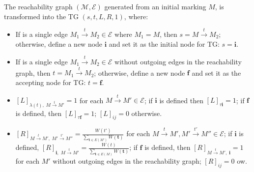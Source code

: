 \begin{definition}\label{def:transf}
The reachability graph $(\mathcal{M},\mathcal{E})$ generated from an initial marking $M$, is transformed into the TG $(s,t,L,R,1)$, where:
\begin{itemize}
	\item If is a single edge $M_1\overset{t}{\to}M_2\in\mathcal{E}$ where $M_1=M$, then $s=M\overset{t}{\to}M_2$; otherwise, define a new node $\textbf{i}$ and set it as the initial node for TG: $s=\textbf{i}$.
	\item If is a single edge $M_1\overset{t}{\to}M_2\in\mathcal{E}$ without outgoing edges in the reachability graph, then $t=M_1\overset{t}{\to}M_2$; otherwise, define a new node $\textbf{f}$ and set it as the accepting node for TG:  $t=\textbf{f}$.
	\item $[L]_{\lambda(t),\;M\overset{t}{\to} M'}=1$ for each $M\overset{t}{\to} M'\in\mathcal{E}$; if $\textbf{i}$ is defined then $[L]_{\tau\textbf{i}}=1$; if $\textbf{f}$ is defined, then $[L]_{\tau\textbf{f}}=1$; $[L]_{ij}=0$ otherwise.
	\item $[R]_{M\overset{t}{\to} M',\;M'\overset{t'}{\to} M''}=\frac{W(t')}{\sum_{\textbf{t}\in E(M')}W(\textbf{t})}$ for each $M\overset{t}{\to} M',M'\overset{t'}{\to} M''\in\mathcal{E}$; if $\textbf{i}$ is defined, $[R]_{\textbf{i},\;M\overset{t}{\to}M'}=\frac{W(t)}{\sum_{\textbf{t}\in E(M)}W(\textbf{t})}$; if $\textbf{f}$ is defined, then $[R]_{M\overset{t}{\to}M',\;\textbf{i}}=1$ for each $M'$ without outgoing edges in the reachability graph; $[R]_{ij}=0$ ow.
\end{itemize}
\end{definition}

\endinput
%
We can show that the TG obtained in Definition \ref{def:transf} preserves the same set of probabilistic traces associated by the reachability graph. The proof is omitted due to the lack of space.

\begin{example}
Figure \ref{fig:lmc} shows the TG obtained from the reachability graph in Figure \ref{fig:rg}. Nodes are labelled with the firing
transition labels (in green), and edges preserve the probabilistic information from the reachability graph (in red). Intuitively, when a
new initial node \textit{\textbf{i}} is inserted, we preserve all the initial probabilistic choices that a transition is fired from an initial
marking $M$, while the intermediate edges inherit the probabilisitc choice of the firing transition from the subsequent choices. When
a new final node \textit{\textbf{f}} is added, such edges always have probability $1$, and thus do not interfere with the
initial traces' probability.
\end{example}

